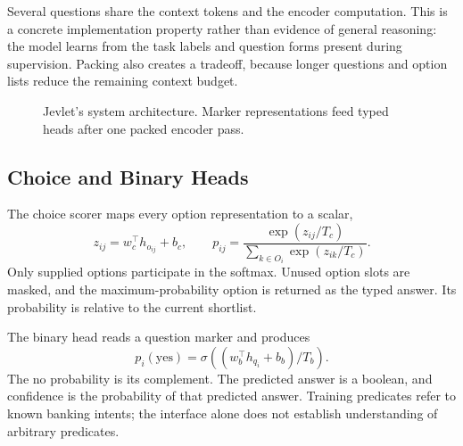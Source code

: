 \documentclass[conference]{IEEEtran}
\begin{document}
Several questions share the context tokens and the encoder computation. This is a concrete implementation property rather than evidence of general reasoning: the model learns from the task labels and question forms present during supervision. Packing also creates a tradeoff, because longer questions and option lists reduce the remaining context budget.


\begin{figure}[t]
\centering
{}
\caption{Jevlet's system architecture. Marker representations feed typed heads after one packed encoder pass.}
\label{fig:architecture}
\end{figure}

\subsection{Choice and Binary Heads}
The choice scorer maps every option representation to a scalar,
\begin{equation}
z_{ij}=w_c^\top h_{o_{ij}}+b_c,\qquad
p_{ij}=\frac{\exp(z_{ij}/T_c)}{\sum_{k\in O_i}\exp(z_{ik}/T_c)}.
\end{equation}
Only supplied options participate in the softmax. Unused option slots are masked, and the maximum-probability option is returned as the typed answer. Its probability is relative to the current shortlist.

The binary head reads a question marker and produces
\begin{equation}
p_i(\mathrm{yes})=\sigma((w_b^\top h_{q_i}+b_b)/T_b).
\end{equation}
The no probability is its complement. The predicted answer is a boolean, and confidence is the probability of that predicted answer. Training predicates refer to known banking intents; the interface alone does not establish understanding of arbitrary predicates.
\end{document}
